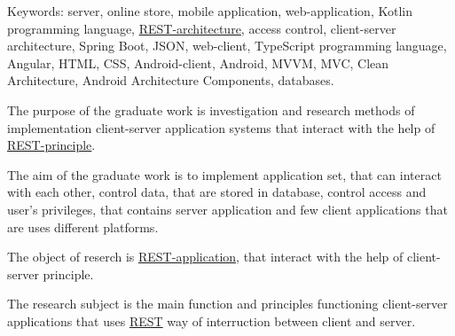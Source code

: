 Keywords: server, online store, mobile application, web-application, Kotlin programming language, \hyperlink{gloss:rest}{REST-architecture}, 
access control, client-server architecture, Spring Boot, JSON, web-client, TypeScript programming language, Angular, HTML, CSS, Android-client, 
Android, MVVM, MVC, Clean Architecture, Android Architecture Components, databases.

The purpose of the graduate work is investigation and research methods of implementation client-server application systems that interact with the help of \hyperlink{gloss:rest}{REST-principle}.

The aim of the graduate work is to implement application set, that can interact with each other, 
control data, that are stored in database, control access and user's privileges, 
that contains server application and few client applications that are uses different platforms.

The object of reserch is \hyperlink{gloss:rest}{REST-application}, that interact with the help of client-server principle.

The research subject is the main function and principles functioning client-server applications that uses \hyperlink{gloss:rest}{REST} way of interruction between client and server.